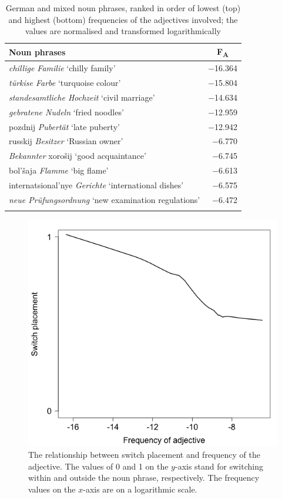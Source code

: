 \begin{table}
		\begin{tabular}{lr} 
			\lsptoprule
			Noun phrases	& \multicolumn{1}{c}{F\textsubscript{A}}\\\midrule
			\textit{chillige Familie} `chilly family'	&−16.364\\
			\textit{türkise Farbe} `turquoise colour'	&−15.804\\
			\textit{standesamtliche Hochzeit}	`civil marriage'	&−14.634\\
			\textit{gebratene Nudeln} `fried noodles'	&−12.959\\
			pozdnij \textit{Pubertät} `late puberty' 	&−12.942 \\
			\midrule
			russkij \textit{Besitzer} `Russian owner'	&−6.770\\
			\textit{Bekannter} xorošij `good acquaintance'	&−6.745\\
			bol'šaja \textit{Flamme} `big flame'	&−6.613\\
			internatsional'nye \textit{Gerichte} `international dishes'	&−6.575\\
			\textit{neue Prüfungsordnung} `new examination regulations'		&−6.472\\
			\lspbottomrule 
		\end{tabular}
\caption{German and mixed noun phrases, ranked in order of lowest (top) and highest (bottom) frequencies of the adjectives involved; the values are normalised and transformed logarithmically\label{tab:4:4}}
\end{table}


\begin{figure}
	\centering
    	\includegraphics[scale=0.5]{figures/4-Fr_A_ru.png}
	\caption{The relationship between switch placement and frequency of the adjective. The values of 0 and 1 on the $y$-axis stand for switching within and outside the noun phrase, respectively. The frequency values on the $x$-axis are on a logarithmic scale.\label{fig:4:adj_ru}}
\end{figure}

